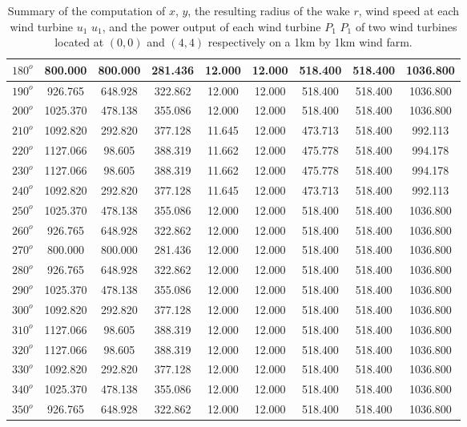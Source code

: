 \begin{table}[H]
\begin{tabular}{|c|c|c|c|c|c|c|c|c|}
$180^o$	&800.000	&800.000	&281.436	&12.000	&12.000	&518.400	&518.400	&1036.800 \\ \hline
$190^o$	&926.765	&648.928	&322.862	&12.000	&12.000	&518.400	&518.400	&1036.800 \\ \hline
$200^o$	&1025.370	&478.138	&355.086	&12.000	&12.000	&518.400	&518.400	&1036.800 \\ \hline
$210^o$	&1092.820	&292.820	&377.128	&11.645	&12.000	&473.713	&518.400	&992.113 \\ \hline
$220^o$	&1127.066	&98.605	&388.319	&11.662	&12.000	&475.778	&518.400	&994.178 \\ \hline
$230^o$	&1127.066	&98.605	&388.319	&11.662	&12.000	&475.778	&518.400	&994.178 \\ \hline
$240^o$	&1092.820	&292.820	&377.128	&11.645	&12.000	&473.713	&518.400	&992.113 \\ \hline
$250^o$	&1025.370	&478.138	&355.086	&12.000	&12.000	&518.400	&518.400	&1036.800 \\ \hline
$260^o$	&926.765	&648.928	&322.862	&12.000	&12.000	&518.400	&518.400	&1036.800 \\ \hline
$270^o$	&800.000	&800.000	&281.436	&12.000	&12.000	&518.400	&518.400	&1036.800 \\ \hline
$280^o$	&926.765	&648.928	&322.862	&12.000	&12.000	&518.400	&518.400	&1036.800 \\ \hline
$290^o$	&1025.370	&478.138	&355.086	&12.000	&12.000	&518.400	&518.400	&1036.800 \\ \hline
$300^o$	&1092.820	&292.820	&377.128	&12.000	&12.000	&518.400	&518.400	&1036.800 \\ \hline
$310^o$	&1127.066	&98.605	&388.319	&12.000	&12.000	&518.400	&518.400	&1036.800 \\ \hline
$320^o$	&1127.066	&98.605	&388.319	&12.000	&12.000	&518.400	&518.400	&1036.800 \\ \hline
$330^o$	&1092.820	&292.820	&377.128	&12.000	&12.000	&518.400	&518.400	&1036.800 \\ \hline
$340^o$	&1025.370	&478.138	&355.086	&12.000	&12.000	&518.400	&518.400	&1036.800 \\ \hline
$350^o$	&926.765	&648.928	&322.862	&12.000	&12.000	&518.400	&518.400	&1036.800 \\ \hline

        \end{tabular}
        \caption{Summary of the computation of $x$, $y$, the resulting radius of the wake $r$, wind speed at each wind turbine $u_1$ $u_1$, and the power output of each wind turbine $P_1$ $P_1$ of two wind turbines located at $(0,0)$ and $(4,4)$ respectively on a 1km by 1km wind farm.}
        \label{summaryBest2}
    \end{table}
    \doublespacing
    
